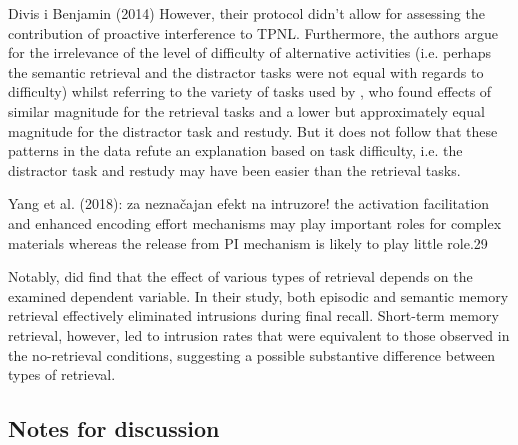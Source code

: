 \documentclass[../main.tex]{subfiles}
\begin{document}
Divis i Benjamin (2014)
However, their protocol didn't allow for assessing the contribution of proactive interference to TPNL. Furthermore, the authors argue for the irrelevance of the level of difficulty of alternative activities (i.e. perhaps the semantic retrieval and the distractor tasks were not equal with regards to difficulty) whilst referring to the variety of tasks used by \cite{pastotterRetrievalLearningFacilitates2011}, who found effects of similar magnitude for the retrieval tasks and a lower but approximately equal magnitude for the distractor task and restudy. But it does not follow that these patterns in the data refute an explanation based on task difficulty, i.e. the distractor task and restudy may have been easier than the retrieval tasks. 



Yang et al. (2018): za neznačajan efekt na intruzore!
the activation facilitation and enhanced encoding effort mechanisms may play
important roles for complex materials whereas the release from PI
mechanism is likely to play little role.29


Notably, \cite{pastotterRetrievalLearningFacilitates2011} did find that the effect
of various types of retrieval depends on the examined dependent variable. In their
study, both episodic and semantic memory retrieval effectively eliminated intrusions
during final recall. Short-term memory retrieval, however, led to intrusion rates 
that were equivalent to those observed in the no-retrieval conditions, suggesting
a possible substantive difference between types of retrieval.


\subsection{Notes for discussion}
\end{document}
